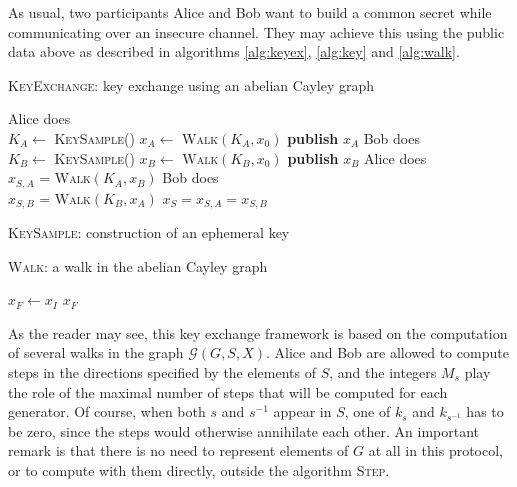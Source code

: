\documentclass{article}
\newcommand{\Graph}{\mathcal{G}}
\newcommand{\algstyle}[1]{\textsc{#1}}
\theoremstyle{definition}
\begin{document}
As usual, two participants Alice and Bob want to build a common secret while
communicating over an insecure channel. They may
achieve this using the public data above as
described in algorithms \ref{alg:keyex}, \ref{alg:key} and \ref{alg:walk}.

\begin{algorithm}
    \caption{\algstyle{KeyExchange}: key exchange using an abelian Cayley graph}
    \label{alg:keyex}
    Alice does\\
			\quad $K_A \gets$ \algstyle{KeySample}()\;
			\quad $x_A \gets$ \algstyle{Walk}$(K_A, x_0)$\;
			\quad \textbf{publish} $x_A$ \;
		Bob does\\
			\quad $K_B \gets$ \algstyle{KeySample}()\;
			\quad $x_B \gets$ \algstyle{Walk}$(K_B, x_0)$\;
			\quad \textbf{publish} $x_B$ \;
		Alice does\\
			\quad $x_{S, A}$ = \algstyle{Walk}$(K_A, x_B)$\;
		Bob does\\
			\quad $x_{S, B}$ = \algstyle{Walk}$(K_B, x_A)$\;
		\Return $x_S = x_{S, A} = x_{S, B}$
\end{algorithm}

\begin{algorithm}
	\caption{\algstyle{KeySample}: construction of an ephemeral key}
	\label{alg:key}
\end{algorithm}

\begin{algorithm}
	\caption{\algstyle{Walk}: a walk in the abelian Cayley graph}
	\label{alg:walk}
	$x_F\gets x_I$\;
	\For{$s\in S$}{
		\lFor{\(0 \le i < k_s\)}{
			$x_F\gets$ \algstyle{Step}$(s, x_F)$
		}
	}
	\Return $x_F$
\end{algorithm}

As the reader may see, this key exchange framework is based on the computation
of several walks in the graph $\Graph(G, S, X)$. Alice and Bob are allowed to
compute steps in the directions specified by the elements of $S$, and the integers
$M_s$ play the role of the maximal number of steps that will be computed
for each generator. Of course, when both $s$ and $s^{-1}$ appear in $S$, one
of $k_s$ and $k_{s^{-1}}$ has to be zero, since the steps would otherwise
annihilate each other.
An important remark is that there is no need to represent
elements of $G$ at all in this protocol, or to compute with them directly,
outside the algorithm \algstyle{Step}.
\end{document}
